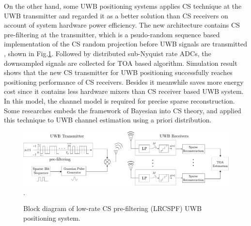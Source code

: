 On the other hand, some UWB positioning systems applies CS technique at the UWB transmitter and regarded it as a better solution than CS receivers on account of system hardware power efficiency. The new architecture contains CS pre-filtering at the transmitter, which is a psudo-random sequence based implementation of the CS random projection before UWB signals are transmitted \cite{zhang2009compressed}, shown in Fig.\ref{cs-uwb-design2}. Followed by distributed sub-Nyquist rate ADCs, the downsampled signals are collected for TOA based algorithm. Simulation result shows that the new CS transmitter for UWB positioning successfully reaches positioning performance of CS receivers. Besides it meanwhile saves more energy cost since it contains less hardware mixers than CS receiver based UWB system. In this model, the channel model is required for precise sparse reconstruction. Some researches embeds the framework of Bayesian into CS theory, and applied this technique to UWB channel estimation using a priori distribution.  

\begin{figure}[!t]
\centering
\includegraphics[width=6.0in]{pictures/cs-uwb-design2.pdf}
\DeclareGraphicsExtensions.
\caption{Block diagram of low-rate CS pre-filtering (LRCSPF) UWB positioning system.}
\label{cs-uwb-design2}
\end{figure}

